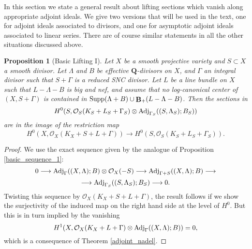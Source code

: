\documentclass[11pt]{amsart}
\theoremstyle{plain}
\newtheorem{proposition}[theorem]{Proposition}
\theoremstyle{definition}
\newcommand{\QQ}{\mathbf{Q}}
\newcommand{\OO}{\mathcal  {O}}
\newcommand{\Adj}{{\rm Adj}}
\DeclareMathOperator{\BB}{{\bf B}}
\begin{document}
In this section we state a general result about lifting sections which vanish along appropriate adjoint ideals. We give two versions that will be used in the text, one for adjoint ideals associated to divisors, and one for asymptotic adjoint ideals associated to linear series. There are of course similar statements in all the other situations discussed above. 

\begin{proposition}[Basic Lifting I]\label{basic_lifting_1}
Let $X$ be a smooth projective variety and $S\subset X$ a smooth divisor. Let $\Lambda$ and $B$ be effective $\QQ$-divisors on $X$, and $\Gamma$ an integral divisor such that $S + \Gamma$ is a reduced SNC divisor. 
Let $L$ be a line bundle on $X$ such that $L - \Lambda - B$ is big and nef, and assume that no log-canonical center of $(X, S+\Gamma)$ is contained in 
${\rm Supp}(\Lambda + B) \cup \BB_{+} (L- \Lambda - B)$. Then the sections in
$$H^0 (S, \OO_S(K_S + L_S + \Gamma_S) \otimes \Adj_{\Gamma_S} ((S, \Lambda_S); B_S) )$$ 
are in the image of the restriction map
$$H^0(X,  \OO_X(K_X + S+ L + \Gamma) )\rightarrow H^0(S,  \OO_S (K_S + L_S + \Gamma_S) ).$$
\end{proposition}
\begin{proof}
We use the exact sequence given by the analogue of Proposition \ref{basic_sequence_1}:
$$0\longrightarrow \Adj_{\Gamma}  ((X, \Lambda); B) \otimes \OO_X(-S) \longrightarrow \Adj_{\Gamma+ S} ((X, \Lambda); 
B)\longrightarrow $$
$$\longrightarrow \Adj_{\Gamma_S} ((S, \Lambda_S); B_S)\longrightarrow 0.$$ 
Twisting this sequence by $\OO_X(K_X + S+ L + \Gamma)$, the result follows if we show the 
surjectivity of the induced map on the right hand side at the level of $H^0$. But this is in turn implied by the vanishing
$$H^1 (X, \OO_X(K_X + L + \Gamma ) \otimes \Adj_{\Gamma} ((X, \Lambda); B)) = 0,$$
which is a consequence of Theorem  \ref{adjoint_nadel}.
\end{proof}
\end{document}
